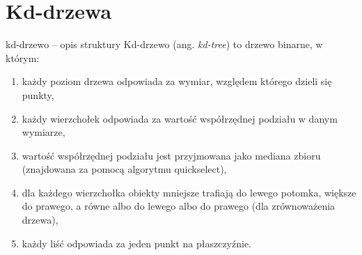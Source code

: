 \documentclass[aspectratio=169,dvipsnames]{beamer}
\begin{document}
\section{Kd-drzewa}

\begin{frame}{kd-drzewo -- opis struktury}
    Kd-drzewo (ang. \textit{kd-tree}) to drzewo binarne, w którym:
    \begin{enumerate}
        \item<2-> każdy poziom drzewa odpowiada za wymiar, względem którego dzieli się punkty,
        \item<3-> każdy wierzchołek odpowiada za wartość współrzędnej podziału w danym wymiarze,
        \item<4-> wartość współrzędnej podziału jest przyjmowana jako mediana zbioru (znajdowana za pomocą algorytmu quickselect),
        \item<5-> dla każdego wierzchołka obiekty mniejsze trafiają do lewego potomka, większe do prawego, a równe albo do lewego albo do prawego (dla zrównoważenia drzewa),
        \item<6-> każdy liść odpowiada za jeden punkt na płaszczyźnie.
    \end{enumerate}
\end{frame}
\end{document}
